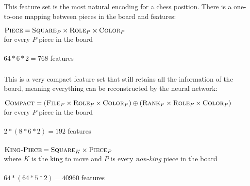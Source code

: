 \subsubsection{\mdseries{}}

This feature set is the most natural encoding for a chess position. There is a one-to-one mapping between pieces in the board and features:

\begin{center}
    $\textsc{Piece} = \textsc{Square}_{P} \times \textsc{Role}_{P} \times \textsc{Color}_{P}$ \\
    for every $P$ piece in the board \\
    ~\\
    $64*6*2=768$ features
\end{center}

\subsubsection{\mdseries{}}

This is a very compact feature set that still retains all the information of the board, meaning everything can be reconstructed by the neural network:

\begin{center}
    $\textsc{Compact} = (\textsc{File}_{P} \times \textsc{Role}_{P} \times \textsc{Color}_{P}) \oplus (\textsc{Rank}_{P} \times \textsc{Role}_{P} \times \textsc{Color}_{P})$ \\
    for every $P$ piece in the board \\
    ~\\
    $2*(8*6*2)=192$ features
\end{center}

\subsubsection{\mdseries{}}

\begin{center}
    $\textsc{King-Piece} = \textsc{Square}_{K} \times \textsc{Piece}_{P}$ \\
    where $K$ is the king to move and $P$ is every \textit{non-king} piece in the board \\
    ~\\
    $64*(64*5*2)=40960$ features
\end{center}

